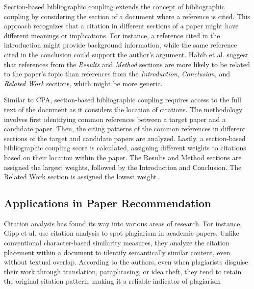 Section-based bibliographic coupling \cite{HabibSectionsbasedBibliographic2019} extends the concept of bibliographic coupling by considering the section of a document where a reference is cited. This approach recognizes that a citation in different sections of a paper might have different meanings or implications. For instance, a reference cited in the introduction might provide background information, while the same reference cited in the conclusion could support the author's argument. Habib et al. \cite{HabibSectionsbasedBibliographic2019} suggest that references from the \emph{Results} and \emph{Method} sections are more likely to be related to the paper's topic than references from the \emph{Introduction}, \emph{Conclusion}, and \emph{Related Work} sections, which might be more generic.

Similar to \ac{CPA}, section-based bibliographic coupling requires access to the full text of the document as it considers the location of citations. The methodology involves first identifying common references between a target paper and a candidate paper. Then, the citing patterns of the common references in different sections of the target and candidate papers are analyzed. Lastly, a section-based bibliographic coupling score is calculated, assigning different weights to citations based on their location within the paper. The Results and Method sections are assigned the largest weights, followed by the Introduction and Conclusion. The Related Work section is assigned the lowest weight \cite{HabibSectionsbasedBibliographic2019}.


\subsection{Applications in Paper Recommendation}

Citation analysis has found its way into various areas of research. For instance, Gipp et al. \cite{GippCitationbasedPlagiarism2014a} use citation analysis to spot plagiarism in academic papers. Unlike conventional character-based similarity measures, they analyze the citation placement within a document to identify semantically similar content, even without textual overlap. According to the authors, even when plagiarists disguise their work through translation, paraphrasing, or idea theft, they tend to retain the original citation pattern, making it a reliable indicator of plagiarism

